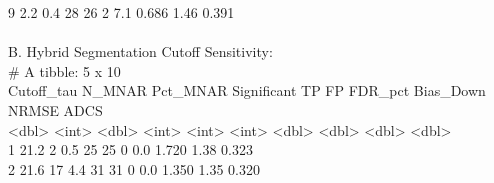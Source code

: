 \documentclass[11pt,oneside]{book}
\begin{document}
\begin{routput}
9 \hspace*{0.5em}2.2 \hspace*{0.8em}0.4 \hspace*{4em}28 \hspace*{1.5em}26 \hspace*{1em}2 \hspace*{2.2em}7.1 \hspace*{2em}0.686 \hspace*{1em}1.46 \hspace*{0.8em}0.391\\
\\
B. Hybrid Segmentation Cutoff Sensitivity:\\
\# A tibble: 5 x 10\\
\hspace*{1em}Cutoff\_tau N\_MNAR Pct\_MNAR Significant \hspace*{0.5em}TP \hspace*{0.5em}FP FDR\_pct Bias\_Down NRMSE \hspace*{0.5em}ADCS\\
\hspace*{1em}\textless{}dbl\textgreater{} \hspace*{2.5em}\textless{}int\textgreater{} \hspace*{1.8em}\textless{}dbl\textgreater{} \hspace*{2.5em}\textless{}int\textgreater{} \textless{}int\textgreater{} \textless{}int\textgreater{} \hspace*{1.2em}\textless{}dbl\textgreater{} \hspace*{1.8em}\textless{}dbl\textgreater{} \textless{}dbl\textgreater{} \textless{}dbl\textgreater{}\\
1 \hspace*{1.2em}21.2 \hspace*{3em}2 \hspace*{2.5em}0.5 \hspace*{4em}25 \hspace*{1.5em}25 \hspace*{1em}0 \hspace*{2.2em}0.0 \hspace*{2em}1.720 \hspace*{1em}1.38 \hspace*{0.8em}0.323\\
2 \hspace*{1.2em}21.6 \hspace*{2.5em}17 \hspace*{2.5em}4.4 \hspace*{4em}31 \hspace*{1.5em}31 \hspace*{1em}0 \hspace*{2.2em}0.0 \hspace*{2em}1.350 \hspace*{1em}1.35 \hspace*{0.8em}0.320\\

\end{routput}
\end{document}
